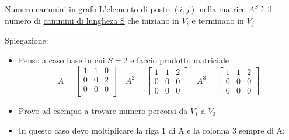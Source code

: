 \begin{teorema}{Numero cammini in grafo}
	L'elemento di posto $ \left( i, j  \right) $ nella matrice $ A ^{ S}$ è il numero di \underline{cammini di lungheza S} che iniziano in $ V_i $ e terminano in $ V_j$
\end{teorema}
Spiegazione:
\begin{itemize}
	\item Penso a caso base in cui $S=2$ e faccio prodotto matriciale
	      \[
		      A=
		      \begin{bmatrix}
			      1 & 1 & 0 \\
			      0 & 0 & 2 \\
			      0 & 0 & 0 \\
		      \end{bmatrix}
		      \quad
		      A^{2} = \begin{bmatrix}
			      1 & 1 & 2 \\
			      0 & 0 & 0 \\
			      0 & 0 & 0
		      \end{bmatrix}
		      \quad A ^{3} =
		      \begin{bmatrix}
			      1 & 1 & 2 \\
			      0 & 0 & 0 \\
			      0 & 0 & 0
		      \end{bmatrix}
	      \]

	\item Provo ad esempio a trovare numero percorsi da $V_1$ a $V_3$
	\item In questo caso devo moltiplicare la riga 1 di A e la colonna 3 sempre di A: \[
	      \]


\end{itemize}

